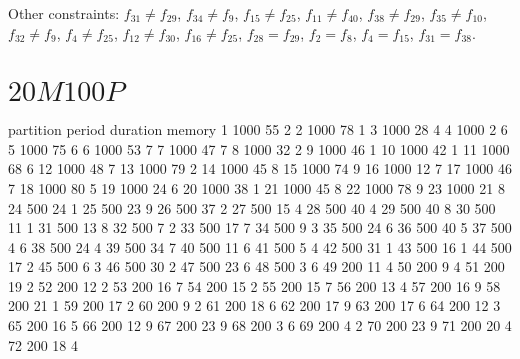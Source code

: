 Other constraints: $f_{31} ≠ f_{29}$, $f_{34} ≠ f_{9}$, $f_{15} ≠ f_{25}$, $f_{11} ≠ f_{40}$, $f_{38} ≠ f_{29}$, $f_{35} ≠ f_{10}$, $f_{32} ≠ f_{9}$, $f_{4} ≠ f_{25}$, $f_{12} ≠ f_{30}$, $f_{16} ≠ f_{25}$, $f_{28} = f_{29}$, $f_{2} = f_{8}$, $f_{4} = f_{15}$, $f_{31} = f_{38}$.

\section{\texorpdfstring{$20M100P$}{20M100P}}

partition period duration memory
1         1000   55       2
2         1000   78       1
3         1000   28       4
4         1000   2        6
5         1000   75       6
6         1000   53       7
7         1000   47       7
8         1000   32       2
9         1000   46       1
10        1000   42       1
11        1000   68       6
12        1000   48       7
13        1000   79       2
14        1000   45       8
15        1000   74       9
16        1000   12       7
17        1000   46       7
18        1000   80       5
19        1000   24       6
20        1000   38       1
21        1000   45       8
22        1000   78       9
23        1000   21       8
24        500    24       1
25        500    23       9
26        500    37       2
27        500    15       4
28        500    40       4
29        500    40       8
30        500    11       1
31        500    13       8
32        500    7        2
33        500    17       7
34        500    9        3
35        500    24       6
36        500    40       5
37        500    4        6
38        500    24       4
39        500    34       7
40        500    11       6
41        500    5        4
42        500    31       1
43        500    16       1
44        500    17       2
45        500    6        3
46        500    30       2
47        500    23       6
48        500    3        6
49        200    11       4
50        200    9        4
51        200    19       2
52        200    12       2
53        200    16       7
54        200    15       2
55        200    15       7
56        200    13       4
57        200    16       9
58        200    21       1
59        200    17       2
60        200    9        2
61        200    18       6
62        200    17       9
63        200    17       6
64        200    12       3
65        200    16       5
66        200    12       9
67        200    23       9
68        200    3        6
69        200    4        2
70        200    23       9
71        200    20       4
72        200    18       4
